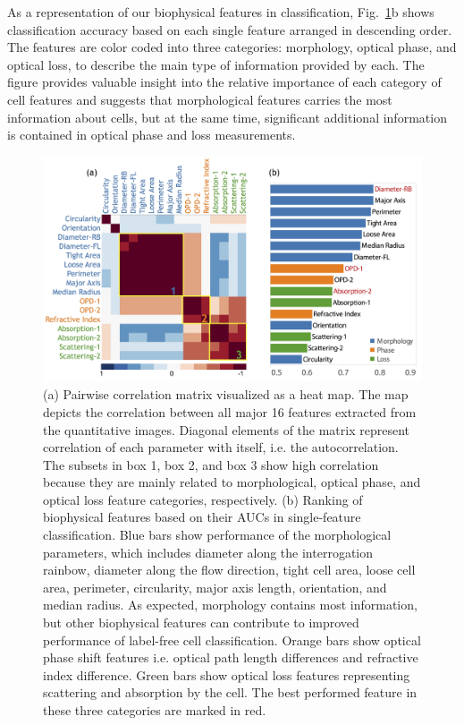 \documentclass[aps,pra,reprint,superscriptaddress]{revtex4-1}
\begin{document}
As a representation of our biophysical features in classification, Fig.~\ref{fig:FeaturesCorrRank}b shows classification accuracy based on each single feature arranged in descending order. The features are color coded into three categories: morphology, optical phase, and optical loss, to describe the main type of information provided by each. The figure provides valuable insight into the relative importance of each category of cell features and suggests that morphological features carries the most information about cells, but at the same time, significant additional information is contained in optical phase and loss measurements. 

\begin{figure}
\includegraphics[scale=0.17]{FigureFeaturesCorrelationRank.jpg}
\caption{\label{fig:FeaturesCorrRank} (a) Pairwise correlation matrix visualized as a heat map. The map depicts the correlation between all major 16 features extracted from the quantitative images. Diagonal elements of the matrix represent correlation of each parameter with itself, i.e. the autocorrelation. The subsets in box 1, box 2, and box 3 show high correlation because they are mainly related to morphological, optical phase, and optical loss feature categories, respectively. (b) Ranking of biophysical features based on their AUCs in single-feature classification. Blue bars show performance of the morphological parameters, which includes diameter along the interrogation rainbow, diameter along the flow direction, tight cell area, loose cell area, perimeter, circularity, major axis length, orientation, and median radius. As expected, morphology contains most information, but other biophysical features can contribute to improved performance of label-free cell classification. Orange bars show optical phase shift features i.e. optical path length differences and refractive index difference. Green bars show optical loss features representing scattering and absorption by the cell. The best performed feature in these three categories are marked in red.}
\end{figure}
\end{document}
